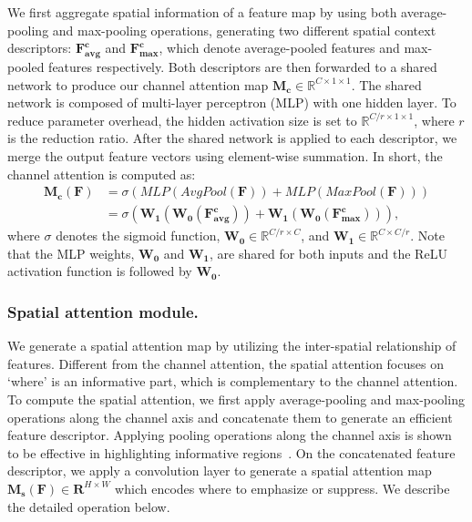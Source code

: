 \documentclass[runningheads]{llncs}
\begin{document}
We first aggregate spatial information of a feature map by using both average-pooling and max-pooling operations, generating two different spatial context descriptors: \(\mathbf{F^{c}_{avg}}\) and \(\mathbf{F^{c}_{max}}\), which denote average-pooled features and max-pooled features respectively. Both descriptors are then forwarded to a shared network to produce our channel attention map \(\mathbf{M_c}\in \mathbb{R}^{C\times 1\times 1}\). The shared network is composed of multi-layer perceptron (MLP) with one hidden layer. To reduce parameter overhead, the hidden activation size is set to \(\mathbb{R}^{C/r\times 1\times 1}\), where \(r\) is the reduction ratio. After the shared network is applied to each descriptor, we merge the output feature vectors using element-wise summation. In short, the channel attention is computed as:
\begin{equation}\label{eq:third}
\begin{split}
    \mathbf{M_c}(\mathbf{F})&=\sigma(MLP(AvgPool(\mathbf{F}))+MLP(MaxPool(\mathbf{F})))\\
    &=\sigma( \mathbf{W_1}(\mathbf{W_0}(\mathbf{F^{c}_{avg}}))+
    \mathbf{W_1}(\mathbf{W_0}(\mathbf{F^{c}_{max}}))),
\end{split}
\end{equation}
where \(\sigma\) denotes the sigmoid function, \(\mathbf{W_0}\in \mathbb{R}^{C/r\times C}\), and \(\mathbf{W_1}\in \mathbb{R}^{C\times C/r}\). Note that the MLP weights, \(\mathbf{W_0}\) and \(\mathbf{W_1}\), are shared for both inputs and the ReLU activation function is followed by \(\mathbf{W_0}\).


\subsubsection{Spatial attention module.}
We generate a spatial attention map by utilizing the inter-spatial relationship of features. Different from the channel attention, the spatial attention focuses on `where' is an informative part, which is complementary to the channel attention. To compute the spatial attention, we first apply average-pooling and max-pooling operations along the channel axis and concatenate them to generate an efficient feature descriptor. Applying pooling operations along the channel axis is shown to be effective in highlighting informative regions~\cite{Zagoruyko2017AT}. %
On the concatenated feature descriptor, we apply a convolution layer to generate a spatial attention map \(\mathbf{M_s}(\mathbf{F})\in \mathbf{R}^{H\times W}\) which encodes where to emphasize or suppress. We describe the detailed operation below.
\end{document}
